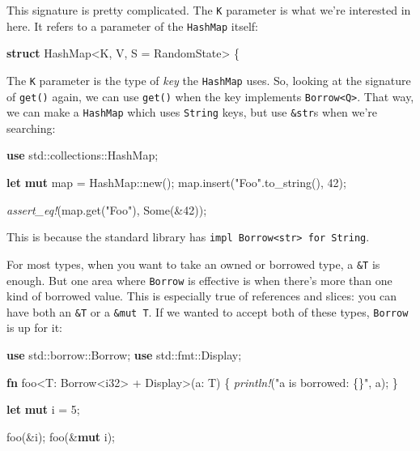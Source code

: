 \documentclass[a4paper,]{book}
\newenvironment{Shaded}{\begin{snugshade}}{\end{snugshade}}
\newcommand{\KeywordTok}[1]{\textcolor[rgb]{0.13,0.29,0.53}{\textbf{{#1}}}}
\newcommand{\DataTypeTok}[1]{\textcolor[rgb]{0.13,0.29,0.53}{{#1}}}
\newcommand{\DecValTok}[1]{\textcolor[rgb]{0.00,0.00,0.81}{{#1}}}
\newcommand{\ConstantTok}[1]{\textcolor[rgb]{0.00,0.00,0.00}{{#1}}}
\newcommand{\StringTok}[1]{\textcolor[rgb]{0.31,0.60,0.02}{{#1}}}
\newcommand{\BuiltInTok}[1]{{#1}}
\newcommand{\PreprocessorTok}[1]{\textcolor[rgb]{0.56,0.35,0.01}{\textit{{#1}}}}
\newcommand{\NormalTok}[1]{{#1}}
\begin{document}
This signature is pretty complicated. The \texttt{K} parameter is what
we're interested in here. It refers to a parameter of the
\texttt{HashMap} itself:

\begin{Shaded}
\begin{Highlighting}[]
\KeywordTok{struct} \NormalTok{HashMap<K, V, S = RandomState> \{}
\end{Highlighting}
\end{Shaded}

The \texttt{K} parameter is the type of \emph{key} the \texttt{HashMap}
uses. So, looking at the signature of \texttt{get()} again, we can use
\texttt{get()} when the key implements
\texttt{Borrow\textless{}Q\textgreater{}}. That way, we can make a
\texttt{HashMap} which uses \texttt{String} keys, but use
\texttt{\&str}s when we're searching:

\begin{Shaded}
\begin{Highlighting}[]
\KeywordTok{use} \NormalTok{std::collections::HashMap;}

\KeywordTok{let} \KeywordTok{mut} \NormalTok{map = HashMap::new();}
\NormalTok{map.insert(}\StringTok{"Foo"}\NormalTok{.to_string(), }\DecValTok{42}\NormalTok{);}

\PreprocessorTok{assert_eq!}\NormalTok{(map.get(}\StringTok{"Foo"}\NormalTok{), }\ConstantTok{Some}\NormalTok{(&}\DecValTok{42}\NormalTok{));}
\end{Highlighting}
\end{Shaded}

This is because the standard library has
\texttt{impl\ Borrow\textless{}str\textgreater{}\ for\ String}.

For most types, when you want to take an owned or borrowed type, a
\texttt{\&T} is enough. But one area where \texttt{Borrow} is effective
is when there's more than one kind of borrowed value. This is especially
true of references and slices: you can have both an \texttt{\&T} or a
\texttt{\&mut\ T}. If we wanted to accept both of these types,
\texttt{Borrow} is up for it:

\begin{Shaded}
\begin{Highlighting}[]
\KeywordTok{use} \NormalTok{std::borrow::Borrow;}
\KeywordTok{use} \NormalTok{std::fmt::}\BuiltInTok{Display}\NormalTok{;}

\KeywordTok{fn} \NormalTok{foo<T: Borrow<}\DataTypeTok{i32}\NormalTok{> + }\BuiltInTok{Display}\NormalTok{>(a: T) \{}
    \PreprocessorTok{println!}\NormalTok{(}\StringTok{"a is borrowed: \{\}"}\NormalTok{, a);}
\NormalTok{\}}

\KeywordTok{let} \KeywordTok{mut} \NormalTok{i = }\DecValTok{5}\NormalTok{;}

\NormalTok{foo(&i);}
\NormalTok{foo(&}\KeywordTok{mut} \NormalTok{i);}
\end{Highlighting}
\end{Shaded}
\end{document}
